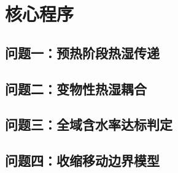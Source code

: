 \section{核心程序}

\subsection{问题一：预热阶段热湿传递}


\subsection{问题二：变物性热湿耦合}


\subsection{问题三：全域含水率达标判定}


\subsection{问题四：收缩移动边界模型}


